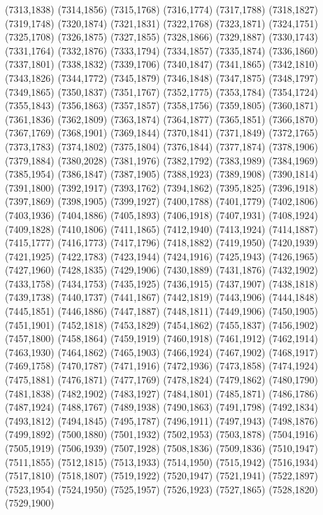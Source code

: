 (7313,1838)
(7314,1856)
(7315,1768)
(7316,1774)
(7317,1788)
(7318,1827)
(7319,1748)
(7320,1874)
(7321,1831)
(7322,1768)
(7323,1871)
(7324,1751)
(7325,1708)
(7326,1875)
(7327,1855)
(7328,1866)
(7329,1887)
(7330,1743)
(7331,1764)
(7332,1876)
(7333,1794)
(7334,1857)
(7335,1874)
(7336,1860)
(7337,1801)
(7338,1832)
(7339,1706)
(7340,1847)
(7341,1865)
(7342,1810)
(7343,1826)
(7344,1772)
(7345,1879)
(7346,1848)
(7347,1875)
(7348,1797)
(7349,1865)
(7350,1837)
(7351,1767)
(7352,1775)
(7353,1784)
(7354,1724)
(7355,1843)
(7356,1863)
(7357,1857)
(7358,1756)
(7359,1805)
(7360,1871)
(7361,1836)
(7362,1809)
(7363,1874)
(7364,1877)
(7365,1851)
(7366,1870)
(7367,1769)
(7368,1901)
(7369,1844)
(7370,1841)
(7371,1849)
(7372,1765)
(7373,1783)
(7374,1802)
(7375,1804)
(7376,1844)
(7377,1874)
(7378,1906)
(7379,1884)
(7380,2028)
(7381,1976)
(7382,1792)
(7383,1989)
(7384,1969)
(7385,1954)
(7386,1847)
(7387,1905)
(7388,1923)
(7389,1908)
(7390,1814)
(7391,1800)
(7392,1917)
(7393,1762)
(7394,1862)
(7395,1825)
(7396,1918)
(7397,1869)
(7398,1905)
(7399,1927)
(7400,1788)
(7401,1779)
(7402,1806)
(7403,1936)
(7404,1886)
(7405,1893)
(7406,1918)
(7407,1931)
(7408,1924)
(7409,1828)
(7410,1806)
(7411,1865)
(7412,1940)
(7413,1924)
(7414,1887)
(7415,1777)
(7416,1773)
(7417,1796)
(7418,1882)
(7419,1950)
(7420,1939)
(7421,1925)
(7422,1783)
(7423,1944)
(7424,1916)
(7425,1943)
(7426,1965)
(7427,1960)
(7428,1835)
(7429,1906)
(7430,1889)
(7431,1876)
(7432,1902)
(7433,1758)
(7434,1753)
(7435,1925)
(7436,1915)
(7437,1907)
(7438,1818)
(7439,1738)
(7440,1737)
(7441,1867)
(7442,1819)
(7443,1906)
(7444,1848)
(7445,1851)
(7446,1886)
(7447,1887)
(7448,1811)
(7449,1906)
(7450,1905)
(7451,1901)
(7452,1818)
(7453,1829)
(7454,1862)
(7455,1837)
(7456,1902)
(7457,1800)
(7458,1864)
(7459,1919)
(7460,1918)
(7461,1912)
(7462,1914)
(7463,1930)
(7464,1862)
(7465,1903)
(7466,1924)
(7467,1902)
(7468,1917)
(7469,1758)
(7470,1787)
(7471,1916)
(7472,1936)
(7473,1858)
(7474,1924)
(7475,1881)
(7476,1871)
(7477,1769)
(7478,1824)
(7479,1862)
(7480,1790)
(7481,1838)
(7482,1902)
(7483,1927)
(7484,1801)
(7485,1871)
(7486,1786)
(7487,1924)
(7488,1767)
(7489,1938)
(7490,1863)
(7491,1798)
(7492,1834)
(7493,1812)
(7494,1845)
(7495,1787)
(7496,1911)
(7497,1943)
(7498,1876)
(7499,1892)
(7500,1880)
(7501,1932)
(7502,1953)
(7503,1878)
(7504,1916)
(7505,1919)
(7506,1939)
(7507,1928)
(7508,1836)
(7509,1836)
(7510,1947)
(7511,1855)
(7512,1815)
(7513,1933)
(7514,1950)
(7515,1942)
(7516,1934)
(7517,1810)
(7518,1807)
(7519,1922)
(7520,1947)
(7521,1941)
(7522,1897)
(7523,1954)
(7524,1950)
(7525,1957)
(7526,1923)
(7527,1865)
(7528,1820)
(7529,1900)
